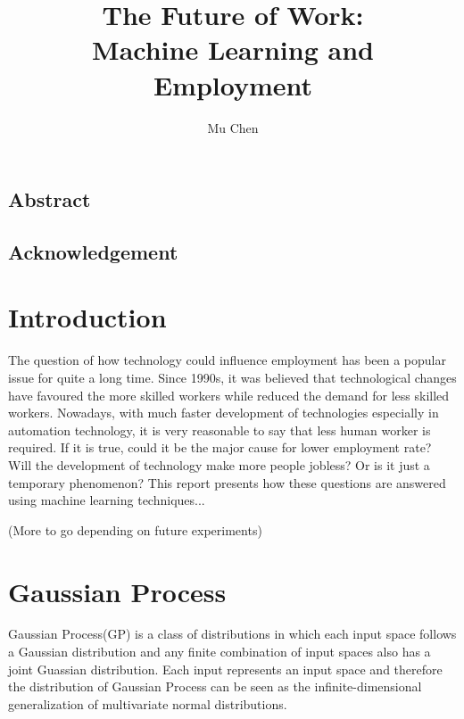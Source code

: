 \documentclass[14pt]{report}
\title{The Future of Work: \\ Machine Learning and Employment}
\author{Mu Chen}
\numberwithin{equation}{chapter}
\begin{document}
\newpage
\maketitle
\section*{Abstract}

\newpage
\section*{Acknowledgement}

\newpage 
{}
\lhead{} 
 
\tableofcontents

\begin{spacing}{2}

\newpage
{}
\setcounter{page}{1}



\chapter{Introduction}
The question of how technology could influence employment has been a popular issue for quite a long time\cite{machin1998}. Since 1990s, it was believed that technological changes have favoured the more skilled workers while reduced the demand for less skilled workers\cite{bound1989changes}. Nowadays, with much faster development of technologies especially in automation technology, it is very reasonable to say that less human worker is required. If it is true, could it be the major cause for lower employment rate? Will the development of technology make more people jobless? Or is it just a temporary phenomenon? This report presents how these questions are answered using machine learning techniques...

(More to go depending on future experiments)



\newpage
\chapter{Gaussian Process}
Gaussian Process(GP) is a class of distributions in which each input space follows a Gaussian distribution and any finite combination of input spaces also has a joint Guassian distribution. Each input represents an input space and therefore the distribution of Gaussian Process can be seen as the infinite-dimensional generalization of multivariate normal distributions. 


\end{spacing}
\end{document}
